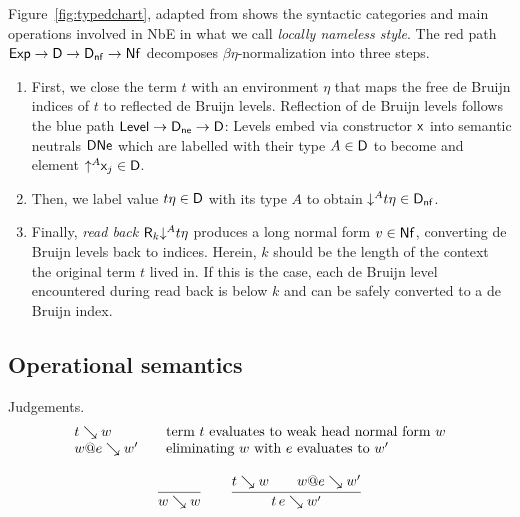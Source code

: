 \documentclass[acmlarge,review,anonymous]{acmart}\settopmatter{printfolios=true}
\begin{document}
Figure~\ref{fig:typedchart}, adapted from \citet{abel:habil} shows the syntactic categories and main operations involved in NbE in what we call \emph{locally nameless style}.  The red path $\mathsf{Exp} \to \mathsf{D} \to \mathsf{D}_{\mathsf{nf}} \to \mathsf{Nf}$ decomposes $\beta\eta$-normalization into three steps.
\begin{enumerate}
\item
First, we close the term $t$ with an environment $\eta$ that maps the free de Bruijn indices of $t$ to reflected de Bruijn levels.  Reflection of de Bruijn levels follows the blue path $\mathsf{Level} \to \mathsf{D}_{\mathsf{ne}} \to \mathsf{D}$: Levels embed via constructor $\mathsf{x}_{}$ into semantic neutrals $\mathsf{DNe}$ which are labelled with their type $A \in \mathsf{D}$ to become and element $\mathord{\uparrow^{A}} \mathsf{x}_{j} \in \mathsf{D}$.

\item
Then, we label value $t \eta \in \mathsf{D}$ with its type $A$ to obtain $\mathord{\downarrow^{A}} t \eta \in \mathsf{D}_{\mathsf{nf}}$.
\item
Finally, \emph{read back} %
$\mathsf{R}_k \mathord{\downarrow^{A}} t\eta$ produces a long normal form $v \in \mathsf{Nf}$, converting de Bruijn levels back to indices.
Herein, $k$ should be the length of the context the original term $t$ lived in.
If this is the case, each de Bruijn level encountered during read back is below $k$ and can be safely converted to a de Bruijn index.
\end{enumerate}

\subsection{Operational semantics}

Judgements.
\[
\begin{array}{l@{\qquad}l}
  t \evalsto w & \mbox{term $t$ evaluates to weak head normal form $w$} \\
  w @ e \evalsto w' & \mbox{eliminating $w$ with $e$ evaluates to $w'$} \\
\end{array}
\]

\begin{gather*}
  \ru{}{w \evalsto w}
\qquad
  \ru{t \evalsto w \qquad w @ e \evalsto w'}{t\,e \evalsto w'}
\end{gather*}

\end{document}
